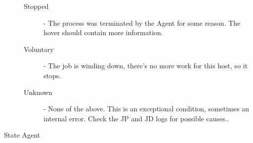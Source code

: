 \begin{description}
\begin{description}
                \item[Stopped]	- The process was terminated by the Agent for some reason.  The hover should
                  contain more information.
                          
                \item[Voluntary] - The job is winding down, there's no more work for this host, so it stops. 
                  
                \item[Unknown] - None of the above. This is an exceptional condition, sometimes an
                  internal {\DUCC} error. Check the JP and JD logs for possible causes..
            \end{description}

          \item[State Agent] \hfill \\
          \label{itm:job-details-state}


\end{description}
